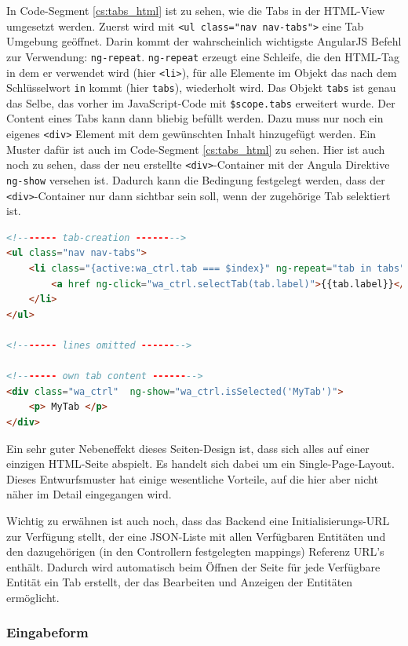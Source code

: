 In Code-Segment \ref{cs:tabs_html} ist zu sehen, wie die Tabs in der HTML-View umgesetzt werden. Zuerst wird mit \verb|<ul class="nav nav-tabs">| eine Tab Umgebung geöffnet. Darin kommt der wahrscheinlich wichtigste AngularJS Befehl zur Verwendung: \verb|ng-repeat|. \verb|ng-repeat| erzeugt eine Schleife, die den HTML-Tag in dem er verwendet wird (hier \verb|<li>|), für alle Elemente im Objekt das nach dem Schlüsselwort \verb|in| kommt (hier \verb|tabs|), wiederholt wird. Das Objekt \verb|tabs| ist genau das Selbe, das vorher im JavaScript-Code mit \verb|$scope.tabs| erweitert wurde. Der Content eines Tabs kann dann bliebig befüllt werden. Dazu muss nur noch ein eigenes \verb|<div>| Element mit dem gewünschten Inhalt hinzugefügt werden. Ein Muster dafür ist auch im Code-Segment \ref{cs:tabs_html} zu sehen. Hier ist auch noch zu sehen, dass der neu erstellte \verb|<div>|-Container mit der Angula Direktive \verb|ng-show| versehen ist. Dadurch kann die Bedingung festgelegt werden, dass der \verb|<div>|-Container nur dann sichtbar sein soll, wenn der zugehörige Tab selektiert ist.

\scriptsize
\begin{lstlisting}[caption=Tab Erstellung in index.html, label=cs:tabs_html, language=HTML]
<!------- tab-creation -------->
<ul class="nav nav-tabs">
	<li class="{active:wa_ctrl.tab === $index}" ng-repeat="tab in tabs">
		<a href ng-click="wa_ctrl.selectTab(tab.label)">{{tab.label}}</a></li>
	</li>
</ul>

<!------- lines omitted -------->

<!------- own tab content -------->
<div class="wa_ctrl"  ng-show="wa_ctrl.isSelected('MyTab')">
	<p> MyTab </p>
</div>
\end{lstlisting}
\normalsize

Ein sehr guter Nebeneffekt dieses Seiten-Design ist, dass sich alles auf einer einzigen HTML-Seite abspielt. Es handelt sich dabei um ein Single-Page-Layout. Dieses Entwurfsmuster hat einige wesentliche Vorteile, auf die hier aber nicht näher im Detail eingegangen wird. 

Wichtig zu erwähnen ist auch noch, dass das Backend eine Initialisierungs-URL zur Verfügung stellt, der eine JSON-Liste mit allen Verfügbaren Entitäten und den dazugehörigen (in den Controllern festgelegten mappings) Referenz URL's enthält. Dadurch wird automatisch beim Öffnen der Seite für jede Verfügbare Entität ein Tab erstellt, der das Bearbeiten und Anzeigen der Entitäten ermöglicht.

\subsubsection{Eingabeform}

